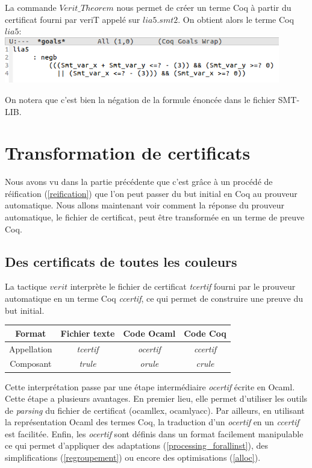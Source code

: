 \documentclass[11pt]{article}
\begin{document}
La commande $Verit\_Theorem$ nous permet de créer un terme Coq à partir du certificat fourni par veriT appelé sur $lia5.smt2$. On obtient alors le terme Coq $lia5$: \\

\includegraphics[height=2cm]{checklia5.png}

On notera que c'est bien la négation de la formule énoncée dans le fichier SMT-LIB. 



\section{Transformation de certificats} \label{transformation_certif}

Nous avons vu dans la partie précédente que c'est grâce à un procédé de réification (\ref{reification}) que l'on peut passer du but initial en Coq au prouveur automatique. Nous allons maintenant voir comment la réponse du prouveur automatique, le fichier de certificat, peut être transformée en un terme de preuve Coq.

\subsection{Des certificats de toutes les couleurs} \label{des_certificats}

La tactique $verit$ interprète le fichier de certificat \textit{tcertif} fourni par le prouveur automatique en un terme Coq \textit{ccertif}, ce qui permet de construire une preuve du but initial. \\

\begin{center}
\begin{tabular}{ |c||c|c|c| } 
 \hline
 Format & Fichier texte & Code Ocaml & Code Coq \\ 
 \hline
 Appellation & \textit{tcertif} & \textit{ocertif} & \textit{ccertif} \\ 
 \hline
 Composant & \textit{trule} & \textit{orule} & \textit{crule} \\ 
 \hline
\end{tabular}
\end{center}

Cette interprétation passe par une étape intermédiaire \textit{ocertif} écrite en Ocaml. Cette étape a plusieurs avantages. En premier lieu, elle permet d'utiliser les outils de \textit{parsing} du fichier de certificat (ocamllex, ocamlyacc). Par ailleurs, en utilisant la représentation Ocaml des termes Coq, la traduction d'un \textit{ocertif} en un \textit{ccertif} est facilitée. Enfin, les \textit{ocertif} sont définis dans un format facilement manipulable ce qui permet d'appliquer des adaptations (\ref{processing_forallinst}), des simplifications (\ref{regroupement}) ou encore des optimisations (\ref{alloc}).
\end{document}
